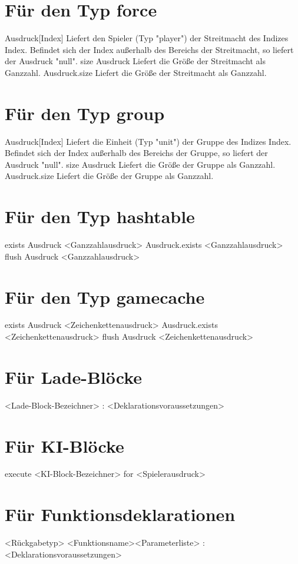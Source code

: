 \section{Für den Typ force}
Ausdruck[Index]					Liefert den Spieler (Typ "player") der Streitmacht des Indizes Index. Befindet sich der Index außerhalb des Bereichs der Streitmacht, so liefert der Ausdruck "null".
size Ausdruck					Liefert die Größe der Streitmacht als Ganzzahl.
Ausdruck.size					Liefert die Größe der Streitmacht als Ganzzahl.

\section{Für den Typ group}
Ausdruck[Index]					Liefert die Einheit (Typ "unit") der Gruppe des Indizes Index. Befindet sich der Index außerhalb des Bereichs der Gruppe, so liefert der Ausdruck "null".
size Ausdruck					Liefert die Größe der Gruppe als Ganzzahl.
Ausdruck.size					Liefert die Größe der Gruppe als Ganzzahl.

\section{Für den Typ hashtable}
exists Ausdruck <Ganzzahlausdruck>
Ausdruck.exists <Ganzzahlausdruck>
flush Ausdruck <Ganzzahlausdruck>

\section{Für den Typ gamecache}
exists Ausdruck <Zeichenkettenausdruck>
Ausdruck.exists <Zeichenkettenausdruck>
flush Ausdruck <Zeichenkettenausdruck>

\section{Für Lade-Blöcke}
<Lade-Block-Bezeichner> : <Deklarationsvoraussetzungen>

\section{Für KI-Blöcke}
execute <KI-Block-Bezeichner> for <Spielerausdruck>

\section{Für Funktionsdeklarationen}
<Rückgabetyp> <Funktionsname><Parameterliste> : <Deklarationsvoraussetzungen>

